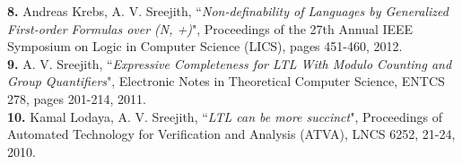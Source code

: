 \documentclass[margin]{res}
\begin{document}
\begin{resume}
{\bf 8.} Andreas Krebs, A. V. Sreejith, ``\emph{Non-definability of Languages by Generalized First-order Formulas over (N, +)}", Proceedings of the 27th Annual IEEE Symposium on Logic in Computer Science (LICS),  pages 451-460, 2012.\\
{\bf 9.} A. V. Sreejith, ``\emph{Expressive Completeness for LTL With Modulo Counting and Group Quantifiers}", Electronic Notes in Theoretical Computer Science, ENTCS 278, pages 201-214, 2011.\\
{\bf 10.} Kamal Lodaya, A. V. Sreejith, ``\emph{LTL can be more succinct}", Proceedings of Automated Technology for Verification and Analysis (ATVA), LNCS 6252, 21-24, 2010.

\end{resume}
\end{document}
